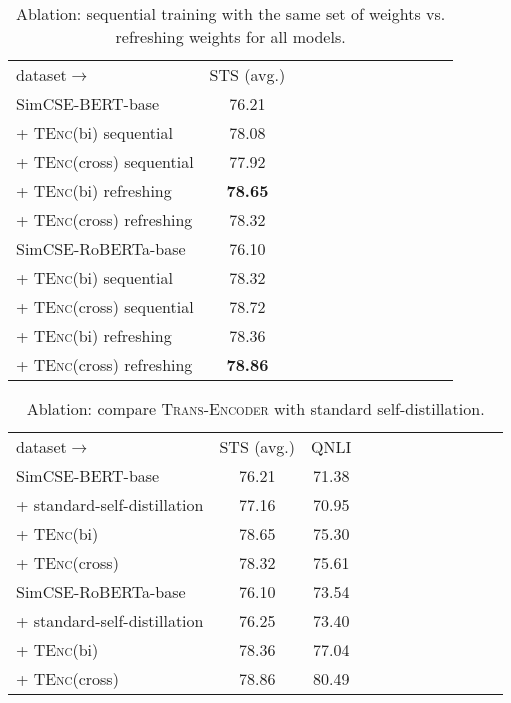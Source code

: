 \documentclass{article} \usepackage{iclr2021_conference,times}
\newcommand{\modelname}{\textsc{Trans-Encoder}\xspace}
\newcommand{\tenc}{\textsc{TEnc}\xspace}
\begin{document}
\begin{table}[!t] \setlength{\tabcolsep}{3.6pt}
\centering
\begin{tabular}{lccccccccccc}
\cmidrule[1.5pt]{1-10}
 dataset$\rightarrow$  & STS (avg.)\\
\cmidrule[1.0pt]{1-10}
 SimCSE-BERT-base & 76.21    \\
 + \tenc (bi) sequential &  78.08  \\
 + \tenc (cross) sequential &  77.92  \\
 + \tenc (bi) refreshing &  \textbf{78.65}  \\
 + \tenc (cross) refreshing & 78.32 \\
  \cmidrule[.5pt]{1-10}
  SimCSE-RoBERTa-base & 76.10  \\
  + \tenc (bi) sequential &   78.32 \\
  + \tenc (cross) sequential &  78.72  \\
  + \tenc (bi) refreshing &  78.36 \\
  + \tenc (cross) refreshing  & \textbf{78.86} \\
  \cmidrule[1.5pt]{1-10}
\end{tabular}
\caption{Ablation: sequential training with the same set of weights vs. refreshing weights for all models.}
\label{tab:sequential}
\end{table}

\begin{table}[!t] \setlength{\tabcolsep}{3.6pt}
\centering
\begin{tabular}{lccccccccccc}
\cmidrule[1.5pt]{1-10}
dataset$\rightarrow$  & STS (avg.) & QNLI & \\
\cmidrule[1.0pt]{1-10}
 SimCSE-BERT-base & 76.21 & 71.38  \\
  + standard-self-distillation & 77.16 & 70.95  \\
 + \tenc (bi) & 78.65 & 75.30 \\
  + \tenc (cross) & 78.32 & 75.61   \\
  \cmidrule[.5pt]{1-10}
SimCSE-RoBERTa-base & 76.10 & 73.54   \\
  + standard-self-distillation & 76.25 & 73.40\\
 + \tenc (bi) & 78.36 & 77.04\\
  + \tenc (cross) &  78.86 & 80.49 \\
  \cmidrule[1.5pt]{1-10}
\end{tabular}
\caption{Ablation: compare \modelname with standard self-distillation.}
\label{tab:standard_self_distil}
\end{table}
\end{document}
